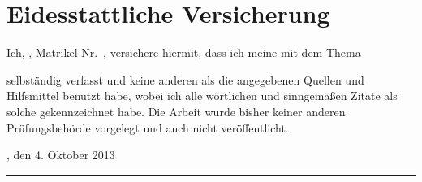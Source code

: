 
\chapter*{Eidesstattliche Versicherung}

\thispagestyle{empty}

Ich, \autor, Matrikel-Nr.\ \matrikelnr, versichere hiermit, dass ich meine \art\xspace mit dem Thema

\begin{quote}
\textit{\titel} \textit{\untertitel}
\end{quote}

selbständig verfasst und keine anderen als die angegebenen Quellen und Hilfsmittel benutzt habe, wobei ich alle wörtlichen und sinngemäßen Zitate als solche gekennzeichnet habe. Die Arbeit wurde bisher keiner anderen Prüfungsbehörde vorgelegt und auch nicht veröffentlicht.

\vspace{8ex}

\ort, den 4. Oktober 2013

\vspace{6ex}


\rule[-0.2cm]{5cm}{0.5pt}

\textsc{\autor} 
